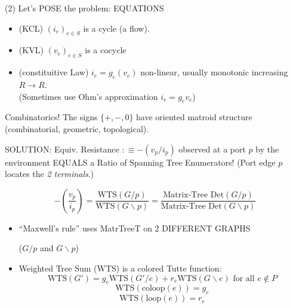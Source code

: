 \documentclass{article}
\begin{document}
\begin{frame}{(2) Let's POSE the problem: EQUATIONS}
\begin{itemize}
\item 
(KCL) $(i_e)_{e\in S}$ is a cycle (a flow).
\item
(KVL) $(v_e)_{e\in S}$ is a cocycle
\item
(constituitive Law) $i_e=g_e(v_e)$
non-linear, usually monotonic increasing $R\rightarrow R$.\\ 
(Sometimes use Ohm's approximation $i_e=g_ev_e$)
\end{itemize}
\begin{block}{Combinatorics!}
The signs $\{ +, -, 0\}$ have oriented matroid structure
(combinatorial, geometric, topological).
\end{block}
\end{frame}



\begin{frame}{SOLUTION: Equiv. Resistance $ :\equiv -(v_p/i_p)$
observed at a port $p$ by the environment
EQUALS a Ratio of Spanning Tree Enumerators!
(Port edge $p$ locates the \textit{2 terminals}.)}

\[
-(\frac{v_p}{i_p})=\frac{\mbox{WTS}(G/p)}
{\mbox{WTS}(G\backslash p)} 
= \frac{\mbox{Matrix-Tree Det}(G/p)}
       {\mbox{Matrix-Tree Det}(G\backslash p)}
\]
\begin{itemize}
\item
``Maxwell's rule'' uses MatrTreeT on 2 DIFFERENT GRAPHS\\
\begin{center}($G/p$ and $G\backslash p$)\end{center}
\item
Weighted Tree Sum (WTS) is a colored Tutte function:
\[
\mbox{WTS}(G') =
g_e \mbox{WTS}(G'/e) + r_e \mbox{WTS} (G \backslash e)
\text{\ for all\ }e \not\in P
\]
\[
\mbox{WTS}(\text{coloop}(e)) = g_e
\]
\[
\mbox{WTS}(\text{loop}(e)) = r_e
\]
\end{itemize}
\end{frame}
\end{document}
